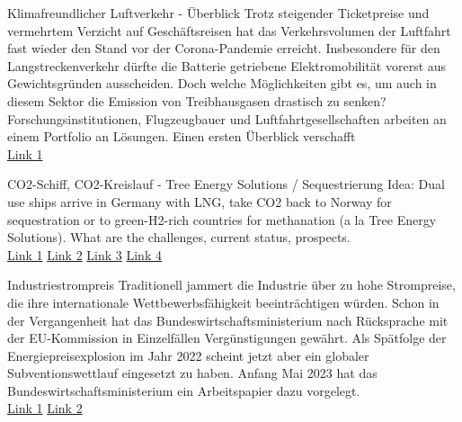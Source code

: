 \documentclass[10pt,aspectratio=169,dvipsnames]{beamer}
\begin{document}
\begin{frame}
    \begin{block}{Klimafreundlicher Luftverkehr - Überblick}
    Trotz steigender Ticketpreise und vermehrtem Verzicht auf Geschäftsreisen hat das Verkehrsvolumen der Luftfahrt fast wieder den Stand vor der Corona-Pandemie erreicht. Insbesondere für den Langstreckenverkehr dürfte die Batterie getriebene Elektromobilität vorerst aus Gewichtsgründen ausscheiden. Doch welche Möglichkeiten gibt es, um auch in diesem Sektor die Emission von Treibhausgasen drastisch zu senken? Forschungsinstitutionen, Flugzeugbauer und Luftfahrtgesellschaften arbeiten an einem Portfolio an Lösungen. Einen ersten Überblick verschafft \\
    \href{https://www.helmholtz-klima.de/aktuelles/klimafreundlich-fliegen}{Link 1}
    \end{block}
    \begin{block}{CO2-Schiff, CO2-Kreislauf - Tree Energy Solutions / Sequestrierung}
    Idea: Dual use ships arrive in Germany with LNG, take CO2 back to Norway for sequestration or to green-H2-rich countries for methanation (a la Tree Energy Solutions). What are the challenges, current status, prospects. \\
    \href{https://maritime-executive.com/article/study-dual-use-lng-shipping-could-transform-carbon-capture}{Link 1}
    \href{https://www.naturalgasworld.com/dual-use-shipping-an-idea-whose-time-has-yet-to-come-gas-in-transition-103245}{Link 2}
    \href{https://www.aiche.org/fscarbonmanagement/cmtc/2019/proceeding/paper/techno-economic-modeling-dual-purpose-lng-co2-shipping}{Link 3}
    \href{https://tes-h2.com/}{Link 4}
    \end{block}
\end{frame}

\begin{frame}
    \begin{block}{Industriestrompreis}
    Traditionell jammert die Industrie über zu hohe Strompreise, die ihre internationale Wettbewerbsfähigkeit beeinträchtigen würden. Schon in der Vergangenheit hat das Bundeswirtschaftsministerium nach Rücksprache mit der EU-Kommission in Einzelfällen Vergünstigungen gewährt. Als Spätfolge der Energiepreisexplosion im Jahr 2022 scheint jetzt aber ein globaler Subventionswettlauf eingesetzt zu haben. Anfang Mai 2023 hat das Bundeswirtschaftsministerium ein Arbeitspapier dazu vorgelegt.\\
    \href{https://www.bmwk.de/Redaktion/DE/Downloads/W/wettbewerbsfaehige-strompreise-fuer-die-energieintensiven-unternehmen-in-deutschland-und-europa-sicherstellen.html}{Link 1}
    \href{https://www.oeko.de/fileadmin/oekodoc/Stellungnahme-Strommarktdesign-Weiterentwicklung.pdf}{Link 2}
    \end{block}
\end{frame}
\end{document}
